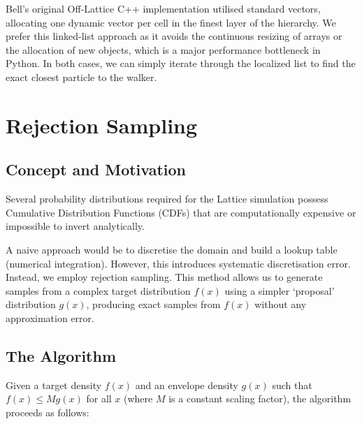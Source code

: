 \documentclass[12pt, a4paper, oneside]{report}
\theoremstyle{remark}
\begin{document}
Bell's original Off-Lattice C++ implementation utilised standard vectors, allocating one dynamic vector per cell in the finest layer of the hierarchy. We prefer this linked-list approach as it avoids the continuous resizing of arrays or the allocation of new objects, which is a major performance bottleneck in Python. In both cases, we can simply iterate through the localized list to find the exact closest particle to the walker.
\section{Rejection Sampling}
\label{app:rejection_sampling}

\subsection{Concept and Motivation}
Several probability distributions required for the Lattice simulation possess Cumulative Distribution Functions (CDFs) that are computationally expensive or impossible to invert analytically.

A naive approach would be to discretise the domain and build a lookup table (numerical integration). However, this introduces systematic discretisation error. Instead, we employ rejection sampling. This method allows us to generate samples from a complex target distribution $f(x)$ using a simpler `proposal' distribution $g(x)$, producing exact samples from $f(x)$ without any approximation error.

\subsection{The Algorithm}
Given a target density $f(x)$ and an envelope density $g(x)$ such that $f(x) \le M g(x)$ for all $x$ (where $M$ is a constant scaling factor), the algorithm proceeds as follows:

\begin{algorithm}[H]
\caption{Rejection Sampling}
\end{algorithm}
\end{document}
